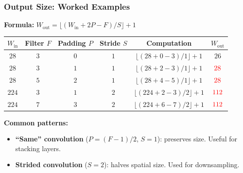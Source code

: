 \documentclass[notes,11pt, aspectratio=169]{beamer}
\begin{document}
\begin{frame}
\frametitle{Output Size: Worked Examples}

\textbf{Formula:} \quad $W_{\text{out}} = \lfloor (W_{\text{in}} + 2P - F)/S \rfloor + 1$

\vspace{8pt}
\renewcommand{\arraystretch}{1.4}
\begin{center}
{\small
\begin{tabular}{ccccc|c}
\toprule
\textbf{$W_{\text{in}}$} & \textbf{Filter $F$} & \textbf{Padding $P$} & \textbf{Stride $S$} & \textbf{Computation} & \textbf{$W_{\text{out}}$} \\
\midrule
$28$ & $3$ & $0$ & $1$ & $\lfloor (28 + 0 - 3)/1 \rfloor + 1$ & $26$ \\
$28$ & $3$ & $1$ & $1$ & $\lfloor (28 + 2 - 3)/1 \rfloor + 1$ & $\textcolor{red}{28}$ \\
$28$ & $5$ & $2$ & $1$ & $\lfloor (28 + 4 - 5)/1 \rfloor + 1$ & $\textcolor{red}{28}$ \\
$224$ & $3$ & $1$ & $2$ & $\lfloor (224 + 2 - 3)/2 \rfloor + 1$ & $\textcolor{red}{112}$ \\
$224$ & $7$ & $3$ & $2$ & $\lfloor (224 + 6 - 7)/2 \rfloor + 1$ & $\textcolor{red}{112}$ \\
\bottomrule
\end{tabular}
}
\end{center}

\vspace{8pt}
\textbf{Common patterns:}
\begin{itemize}
    \item \textbf{``Same'' convolution} ($P = (F-1)/2$, $S=1$): preserves size. Useful for stacking layers.
    \item \textbf{Strided convolution} ($S = 2$): halves spatial size. Used for downsampling.
\end{itemize}
\end{frame}
\end{document}
